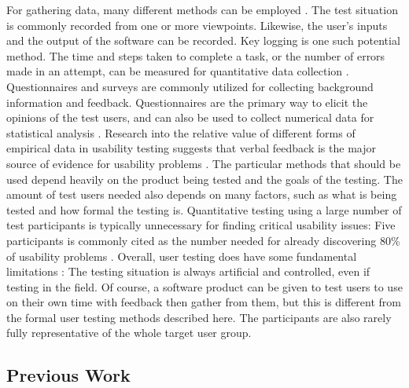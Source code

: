 \documentclass[english, 12pt, a4paper, pdftex, elec, utf8]{aaltothesis}
\begin{document}
For gathering data, many different methods can be employed \cite{rubin2008handbook, ebling2000contributions}. The test situation is commonly recorded from one or more viewpoints. Likewise, the user's inputs and the output of the software can be recorded. Key logging is one such potential method. The time and steps taken to complete a task, or the number of errors made in an attempt, can be measured for quantitative data collection \cite{ebling2000contributions}. Questionnaires and surveys are commonly utilized for collecting background information and feedback. Questionnaires are the primary way to elicit the opinions of the test users, and can also be used to collect numerical data for statistical analysis \cite{rubin2008handbook}. Research into the relative value of different forms of empirical data in usability testing suggests that verbal feedback is the major source of evidence for usability problems \cite{ebling2000contributions}. The particular methods that should be used depend heavily on the product being tested and the goals of the testing. The amount of test users needed also depends on many factors, such as what is being tested and how formal the testing is. Quantitative testing using a large number of test participants is typically unnecessary for finding critical usability issues: Five participants is commonly cited as the number needed for already discovering 80\% of usability problems \cite{rubin2008handbook, riihiaho2015}. Overall, user testing does have some fundamental limitations \cite[p.~26]{rubin2008handbook}: The testing situation is always artificial and controlled, even if testing in the field. Of course, a software product can be given to test users to use on their own time with feedback then gather from them, but this is different from the formal user testing methods described here. The participants are also rarely fully representative of the whole target user group.

\subsection{Previous Work} \label{subsec:work}
\end{document}
